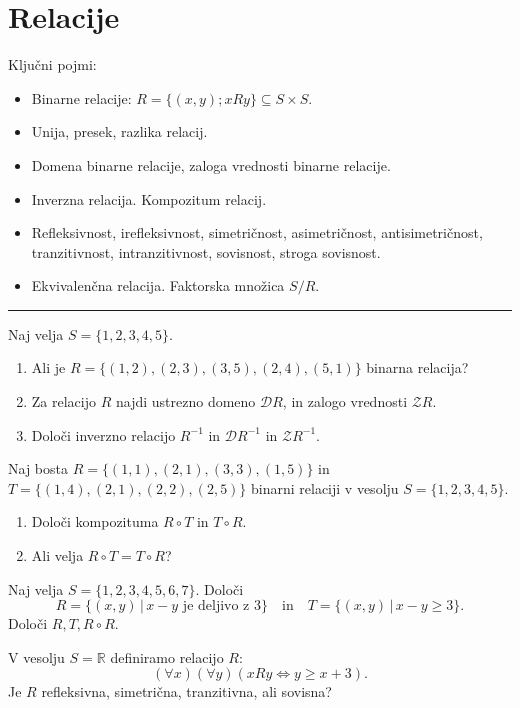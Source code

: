 \documentclass[11pt,paper=b5,footinclude,headinclude]{scrbook} %
\newtheorem{ex}{Vaja\hypertarget{sol:\theex}}[chapter]
\begin{document}
\chapter{Relacije}
Ključni pojmi:
\begin{itemize}
  \item Binarne relacije:
  $R = \{(x,y) ; xRy \}\subseteq S\times S$.
  \item Unija, presek, razlika relacij.
  \item Domena binarne relacije, zaloga vrednosti binarne relacije.
  \item Inverzna relacija. Kompozitum relacij.
\item Refleksivnost, irefleksivnost, simetričnost, asimetričnost, antisimetričnost, tranzitivnost, intranzitivnost,
sovisnost, stroga sovisnost.
\item Ekvivalenčna relacija. Faktorska množica $S/R$.
\end{itemize}
\hrule
\begin{ex}

 Naj velja $S=\{1,2,3,4,5\}$. 
\begin{enumerate}
    \item Ali je  $R=\{(1,2),(2,3), (3,5), (2,4), (5,1)\}$ binarna relacija?
    \item Za relacijo $R$ najdi ustrezno domeno $\mathcal{D} R$, in zalogo vrednosti $\mathcal{Z} R$.
    \item 
  Določi inverzno relacijo $R^{-1}$ in  $\mathcal{D} R^{-1}$ in  $\mathcal{Z} R^{-1}$.
\end{enumerate}

\end{ex}
\begin{ex}
 Naj bosta $R=\{(1,1),(2,1), (3,3), (1,5)\}$  in $T=\{(1,4),(2,1), (2,2), (2,5)\}$ binarni relaciji v vesolju $S=\{1,2,3,4,5\}$. \begin{enumerate}
    \item 
Določi kompozituma  $R\circ T$ in $T\circ R$. 
\item Ali velja $R\circ T = T \circ R$?
\end{enumerate}

\end{ex}
\begin{ex}
 Naj velja  $S=\{1,2,3,4,5,6,7\}$. Določi
$$R= \{(x,y)\,|\, x-y \text{ je deljivo z  }  3\} \quad \mathrm{ in } \quad  T= \{(x,y)\,|\, x-y \geq 3\}.$$
Določi $R,T, R\circ R$.


\end{ex}
\begin{ex}
 V vesolju  $S= \mathbb{R}$  definiramo  relacijo $R$:
$$(\forall x)(\forall y)(x R y \Leftrightarrow y \geq x +3).$$
Je $R$ refleksivna, simetrična, tranzitivna, ali sovisna?

\end{ex}
\end{document}
